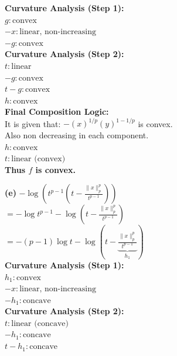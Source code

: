 \documentclass{article}
\begin{document}
\noindent \textbf{Curvature Analysis (Step 1):} \\
\indent $g : \text{convex}$ \\
\indent $-x : \text{linear, non-increasing}$ \\
\indent $-g : \text{convex}$ \\[1.5em]

\noindent \textbf{Curvature Analysis (Step 2):} \\
\indent $t : \text{linear}$ \\
\indent $-g : \text{convex}$ \\
\indent $t - g : \text{convex}$ \\
\indent $h : \text{convex}$ \\[1.5em]

\noindent \textbf{Final Composition Logic:} \\
\indent It is given that: $-(x)^{1/p} (y)^{1 - 1/p}$ is convex. \\
\indent Also non decreasing in each component. \\
\indent $h : \text{convex}$ \\
\indent $t : \text{linear (convex)}$ \\[2em]

\noindent \textbf{Thus $f$ is convex.}




\textbf{(e)} \noindent $-\log\left(t^{p-1} \left(t - \frac{\|x\|_p^p}{t^{p-1}}\right)\right)$ \\[1.5em]

\noindent $= -\log t^{p-1} - \log\left(t - \frac{\|x\|_p^p}{t^{p-1}}\right)$ \\[1.5em]

\noindent $= -(p-1) \log t - \log\left(t - \underbrace{\frac{\|x\|_p^p}{t^{p-1}}}_{h_1}\right)$ \\[2em]

\noindent \textbf{Curvature Analysis (Step 1):} \\
\indent $h_1 : \text{convex}$ \\
\indent $-x : \text{linear, non-increasing}$ \\
\indent $-h_1 : \text{concave}$ \\[1.5em]

\noindent \textbf{Curvature Analysis (Step 2):} \\
\indent $t : \text{linear (concave)}$ \\
\indent $-h_1 : \text{concave}$ \\
\indent $t - h_1 : \text{concave}$ \\[1.5em]
\end{document}
